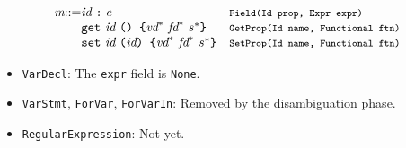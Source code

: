 \documentclass[a4paper, leqno]{amsart}
\newcommand{\myid}{\emph{id}}
\newcommand{\stmt}{s}
\newcommand{\expr}{e}
\newcommand{\fd}{\emph{fd}}
\newcommand{\vd}{\emph{vd}}
\newcommand{\member}{\emph{m}}
\newcommand{\mtt}[1]{\mbox{\tt\footnotesize #1}}
\begin{document}
\[\begin{array}{l@{}l@{}ll}
\member &::=& \myid \ \verb+:+ \ \expr & \mtt{Field(Id prop, Expr expr)}\\
 &\mid& {\tt get}\ \myid\ \verb+() {+ \vd^*\ \fd^*\ \stmt^* \verb+}+ 
 & \mtt{GetProp(Id name, Functional ftn)}\\
 &\mid& {\tt set}\ \myid\ \verb+(+ \myid \verb+) {+ \vd^*\ \fd^*\ \stmt^* \verb+}+
 & \mtt{SetProp(Id name, Functional ftn)}\\
\end{array}
\]


\begin{itemize}
\item {\tt VarDecl}: The {\tt expr} field is {\tt None}.
\item {\tt VarStmt}, {\tt ForVar}, {\tt ForVarIn}: Removed by the disambiguation phase.
\item {\tt RegularExpression}: Not yet.
\end{itemize}
\end{document}

